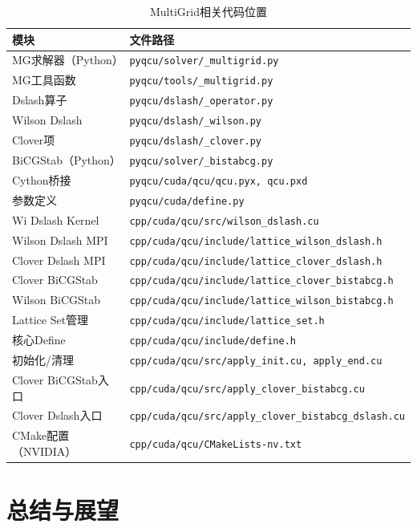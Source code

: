 \documentclass[11pt,a4paper]{article}
\begin{document}
\begin{table}[h]
\centering
\caption{MultiGrid相关代码位置}
\label{tab:code_nav}
\begin{tabular}{@{}lp{9cm}@{}}
\toprule
\textbf{模块} & \textbf{文件路径} \\
\midrule
MG求解器（Python） & \texttt{pyqcu/solver/\_multigrid.py} \\
MG工具函数 & \texttt{pyqcu/tools/\_multigrid.py} \\
Dslash算子 & \texttt{pyqcu/dslash/\_operator.py} \\
Wilson Dslash & \texttt{pyqcu/dslash/\_wilson.py} \\
Clover项 & \texttt{pyqcu/dslash/\_clover.py} \\
BiCGStab（Python） & \texttt{pyqcu/solver/\_bistabcg.py} \\
Cython桥接 & \texttt{pyqcu/cuda/qcu/qcu.pyx, qcu.pxd} \\
参数定义 & \texttt{pyqcu/cuda/define.py} \\
\midrule
Wi Dslash Kernel & \texttt{cpp/cuda/qcu/src/wilson\_dslash.cu} \\
Wilson Dslash MPI & \texttt{cpp/cuda/qcu/include/lattice\_wilson\_dslash.h} \\
Clover Dslash MPI & \texttt{cpp/cuda/qcu/include/lattice\_clover\_dslash.h} \\
Clover BiCGStab & \texttt{cpp/cuda/qcu/include/lattice\_clover\_bistabcg.h} \\
Wilson BiCGStab & \texttt{cpp/cuda/qcu/include/lattice\_wilson\_bistabcg.h} \\
Lattice Set管理 & \texttt{cpp/cuda/qcu/include/lattice\_set.h} \\
核心Define & \texttt{cpp/cuda/qcu/include/define.h} \\
初始化/清理 & \texttt{cpp/cuda/qcu/src/apply\_init.cu, apply\_end.cu} \\
Clover BiCGStab入口 & \texttt{cpp/cuda/qcu/src/apply\_clover\_bistabcg.cu} \\
Clover Dslash入口 & \texttt{cpp/cuda/qcu/src/apply\_clover\_bistabcg\_dslash.cu} \\
CMake配置（NVIDIA） & \texttt{cpp/cuda/qcu/CMakeLists-nv.txt} \\
\bottomrule
\end{tabular}
\end{table}

\section{总结与展望}
\end{document}
